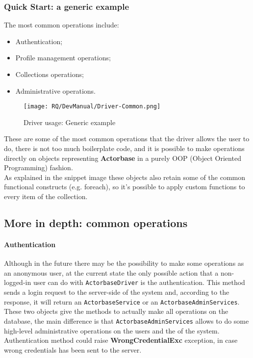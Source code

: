 \documentclass{scalatekids-article}
\begin{document}
\subsubsection{Quick Start: a generic example}

The most common operations include:
\begin{itemize}
\item Authentication;
\item Profile management operations;
\item Collections operations;
\item Administrative operations.
\end{itemize}

\begin{figure}[H]
  \begin{center}
    \texttt{[image: RQ/DevManual/Driver-Common.png]}
    \caption{Driver usage: Generic example}
  \end{center}
\end{figure}

These are some of the most common operations that the driver allows the user to do,
there is not too much boilerplate code, and it is possible
to make operations directly on objects representing \textbf{Actorbase}
 in a purely OOP (Object Oriented Programming) fashion.\\
As explained in the snippet image these objects also retain some of the common functional constructs (e.g.
foreach), so it's possible to apply custom functions to every item of the
collection.

\subsection{More in depth: common operations}

\paragraph{Authentication}

Although in the future there may be the possibility to make some
operations as an anonymous user, at the current state the only possible action
that a non-logged-in user can do with \verb=ActorbaseDriver= is the authentication.
This method sends a login request to the server-side of the system and, according
to the response, it will return an \verb=ActorbaseService= or an
\verb=ActorbaseAdminServices=. These two objects give the methods to
actually make all operations on the database, the main difference is that
\verb=ActorbaseAdminServices= allows to do some high-level
administrative operations on the users and the  of the system.\\
Authentication method could raise \textbf{WrongCredentialExc} exception, in case
wrong credentials has been sent to the server.
\end{document}
